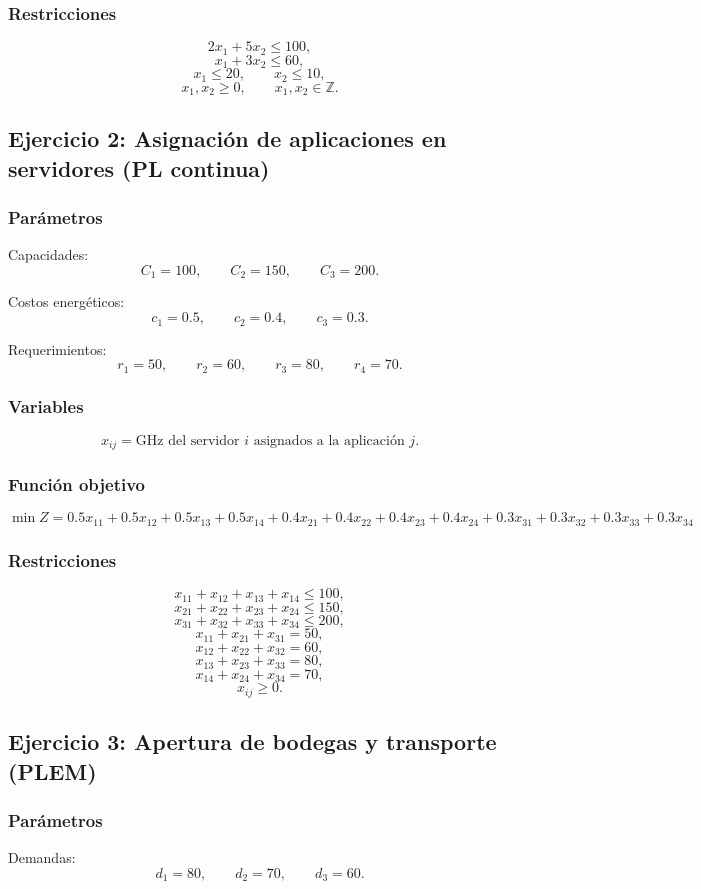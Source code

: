 \documentclass[12pt,a4paper]{article}
\begin{document}
\subsubsection*{Restricciones}
\[
2x_1+5x_2\le 100,
\]
\[
x_1+3x_2\le 60,
\]
\[
x_1\le 20,\qquad x_2\le 10,
\]
\[
x_1,x_2\ge 0,\qquad x_1,x_2\in\mathbb{Z}.
\]

\subsection{Ejercicio 2: Asignación de aplicaciones en servidores (PL continua)}

\subsubsection*{Parámetros}
Capacidades:
\[
C_1=100,\qquad C_2=150,\qquad C_3=200.
\]

Costos energéticos:
\[
c_1=0.5,\qquad c_2=0.4,\qquad c_3=0.3.
\]

Requerimientos:
\[
r_1=50,\qquad r_2=60,\qquad r_3=80,\qquad r_4=70.
\]

\subsubsection*{Variables}
\[
x_{ij}=\text{GHz del servidor } i \text{ asignados a la aplicación } j.
\]

\subsubsection*{Función objetivo}
\[
\min Z = 0.5x_{11}+0.5x_{12}+0.5x_{13}+0.5x_{14}
+0.4x_{21}+0.4x_{22}+0.4x_{23}+0.4x_{24}
+0.3x_{31}+0.3x_{32}+0.3x_{33}+0.3x_{34}
\]

\subsubsection*{Restricciones}
\[
x_{11}+x_{12}+x_{13}+x_{14}\le 100,
\]
\[
x_{21}+x_{22}+x_{23}+x_{24}\le 150,
\]
\[
x_{31}+x_{32}+x_{33}+x_{34}\le 200,
\]
\[
x_{11}+x_{21}+x_{31}=50,
\]
\[
x_{12}+x_{22}+x_{32}=60,
\]
\[
x_{13}+x_{23}+x_{33}=80,
\]
\[
x_{14}+x_{24}+x_{34}=70,
\]
\[
x_{ij}\ge 0.
\]

\subsection{Ejercicio 3: Apertura de bodegas y transporte (PLEM)}

\subsubsection*{Parámetros}
Demandas:
\[
d_1=80,\qquad d_2=70,\qquad d_3=60.
\]
\end{document}
